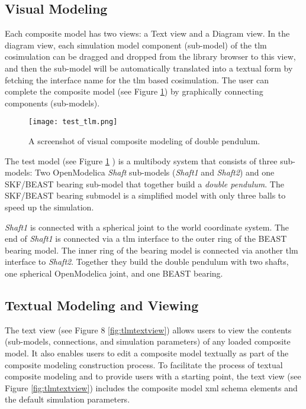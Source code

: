 \subsection{Visual Modeling}
\label{sec:tlmvisual}

Each composite model has two views: a Text view and a Diagram view. In the diagram view, each simulation
model component (sub-model) of the \acrshort{tlm} cosimulation can be dragged and dropped from the library browser to this view, and then the sub-model will be automatically translated into a textual form by fetching the interface name for the \acrshort{tlm} based cosimulation. The user can complete the composite model (see Figure \ref{fig:tlmtest}) by graphically connecting components (sub-models).

\begin{landscape}
\begin{figure}
	\texttt{[image: test\_tlm.png]}
	\caption{A screenshot of visual composite modeling of double pendulum.}
	\label{fig:tlmtest}
\end{figure}
\end{landscape}

The test model (see Figure \ref{fig:tlmtest} ) is a multibody system that consists of three sub-models: Two OpenModelica
\textit{Shaft} sub-models (\textit{Shaft1} and \textit{Shaft2}) and one SKF/BEAST bearing sub-model that together build a \textit{double pendulum}. The SKF/BEAST bearing submodel is a simplified model with only three balls to speed up the simulation. 

\textit{Shaft1} is connected with a spherical joint to the world coordinate system. The end of \textit{Shaft1} is connected via a \acrshort{tlm} interface to the outer ring of the BEAST bearing model. The inner ring of the bearing model is connected via another \acrshort{tlm} interface to \textit{Shaft2}. Together they build the double pendulum with two shafts, one spherical OpenModelica joint, and one BEAST bearing. 

\subsection{Textual Modeling and Viewing}
\label{sec:tlmtextual}

The text view (see Figure 8 \ref{fig:tlmtextview}) allows users to view the contents (sub-models, connections, and simulation
parameters) of any loaded composite model. It also enables users to edit a composite model textually as
part of the composite modeling construction process. To facilitate the process of textual composite modeling
and to provide users with a starting point, the text view (see Figure \ref{fig:tlmtextview}) includes the composite model \acrshort{xml}
schema elements and the default simulation parameters. 

